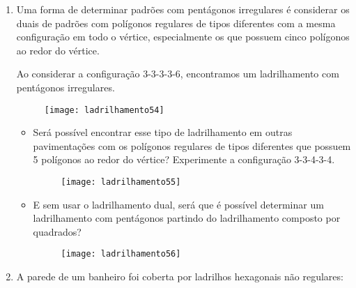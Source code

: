 {\begin{enumerate}
\begin{figure}[H]
	\end{figure}

	\begin{enumerate}
		\item Ela será capaz de criar um ladrilhamento usando essas formas? Explique
\item Será que Alice consegue fazer um ladrilhamento usando pentágonos regulares e triângulos, não necessariamente regulares?
	\end{enumerate}
	
	
	\item Uma forma de determinar padrões com pentágonos irregulares é considerar os duais de padrões com polígonos regulares de tipos diferentes com a mesma configuração em todo o vértice, especialmente os que possuem cinco polígonos ao redor do vértice.

Ao considerar a configuração 3-3-3-3-6, encontramos um ladrilhamento com pentágonos irregulares.

\begin{figure}[H]
	\centering
	\texttt{[image: ladrilhamento54]}

\end{figure}

\begin{itemize}


\item Será possível encontrar esse tipo de ladrilhamento em outras pavimentações com os polígonos regulares de tipos diferentes que possuem 5 polígonos ao redor do vértice? 	Experimente a configuração 3-3-4-3-4.

	\begin{figure}[H]
	\centering
	\texttt{[image: ladrilhamento55]}

	\end{figure}

\item 	E sem usar o ladrilhamento dual, será que é possível determinar um ladrilhamento com pentágonos partindo do ladrilhamento composto por quadrados?

	\begin{figure}[H]
	\centering
	\texttt{[image: ladrilhamento56]}

	\end{figure}

\end{itemize}


\item  A parede de um banheiro foi coberta por ladrilhos hexagonais não regulares:


\end{enumerate}}
